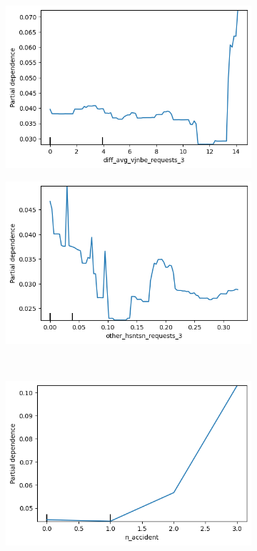 \documentclass[12pt,titlepage]{article}
\begin{document}
\begin{figure}[h!]
\begin{subfigure}{.55\textwidth}
        \includegraphics[width=1\linewidth]{pdp_diff_avg_vjnbe_requests_3.png}
    \end{subfigure}%
    \begin{subfigure}{.55\textwidth}
        \centering
        \includegraphics[width=1\linewidth]{pdp_other_hsntsn_requests_3.png}
    \end{subfigure} \\
    \begin{subfigure}{.55\textwidth}
        \centering
        \includegraphics[width=1\linewidth]{pdp_n_accident.png}

\end{subfigure}
\end{figure}
\end{document}
